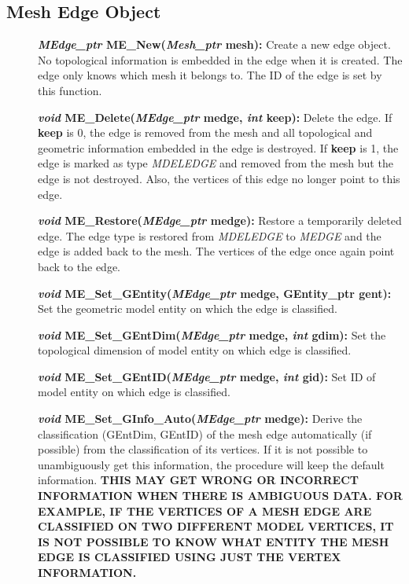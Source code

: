 \documentclass[12pt]{article}
\begin{document}
\newpage
\subsection{Mesh Edge Object}

\begin{description}
\item[]{\bf {\em MEdge\_ptr} ME\_New({\em Mesh\_ptr} mesh):}
  Create a new edge object. No topological information is embedded in
  the edge when it is created. The edge only knows which mesh it
  belongs to. The ID of the edge is set by this function.
  
\item[]{\bf {\em void} ME\_Delete({\em MEdge\_ptr} medge,
    {\em int} keep):} Delete the edge. If {\bf keep} is 0, the
  edge is removed from the mesh and all topological and geometric
  information embedded in the edge is destroyed. If {\bf keep} is
  1, the edge is marked as type {\em MDELEDGE} and removed from the
  mesh but the edge is not destroyed. Also, the vertices of this edge
  no longer point to this edge.
    
\item[]{\bf {\em void} ME\_Restore({\em MEdge\_ptr}
    medge):} Restore a temporarily deleted edge. The edge type is
  restored from {\em MDELEDGE} to {\em MEDGE} and the edge is
  added back to the mesh. The vertices of the edge once again point
  back to the edge.

\item[]
  
\item[]{\bf {\em void} ME\_Set\_GEntity({\em MEdge\_ptr}
    medge, GEntity\_ptr gent):} Set the geometric model entity on
  which the edge is classified.
  
\item[]{\bf {\em void} ME\_Set\_GEntDim({\em MEdge\_ptr}
    medge, {\em int} gdim):} Set the topological dimension of model
  entity on which edge is classified.
  
\item[]{\bf {\em void} ME\_Set\_GEntID({\em MEdge\_ptr}
    medge, {\em int} gid):} Set ID of model entity on which edge is
  classified.
  
\item[]{\bf {\em void} ME\_Set\_GInfo\_Auto({\em MEdge\_ptr} medge):}
  Derive the classification (GEntDim, GEntID) of the mesh edge
  automatically (if possible) from the classification of its
  vertices. If it is not possible to unambiguously get this
  information, the procedure will keep the default information. {\bf THIS
  MAY GET WRONG OR INCORRECT INFORMATION WHEN THERE IS AMBIGUOUS
  DATA. FOR EXAMPLE, IF THE VERTICES OF A MESH EDGE ARE CLASSIFIED ON
  TWO DIFFERENT MODEL VERTICES, IT IS NOT POSSIBLE TO KNOW WHAT ENTITY
  THE MESH EDGE IS CLASSIFIED USING JUST THE VERTEX INFORMATION.}


\end{description}
\end{document}
